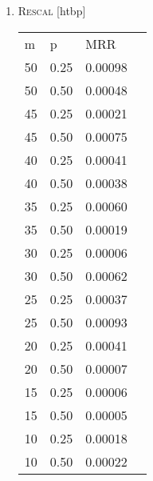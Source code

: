 \documentclass{tufte-handout}
\makeatletter
\renewenvironment{table}[1][htbp]{%
\@tufte@orig@float{table}[#1]}{%
\@tufte@orig@endfloat}%
\makeatother
\begin{document}
\begin{enumerate}
Another discouraging fact is the histogram of shortest paths between employees
and their organizations after removal of the direct edge between them:
\begin{verbatim}
{2: 187, 3: 2654, 4: 292, 5: 575, 6: 5, 7: 11, 8: 3, 9: 1, inf: 607}
\end{verbatim}
\item \textsc{Rescal}
  \begin{table}[htbp]
    \centering
    \begin{tabular}{l l l l}
  m  &   p  & MRR \\
  50 & 0.25 & 0.00098\\
  50 & 0.50 & 0.00048\\
  45 & 0.25 & 0.00021\\
  45 & 0.50 & 0.00075\\
  40 & 0.25 & 0.00041\\
  40 & 0.50 & 0.00038\\
  35 & 0.25 & 0.00060\\
  35 & 0.50 & 0.00019\\
  30 & 0.25 & 0.00006\\
  30 & 0.50 & 0.00062\\
  25 & 0.25 & 0.00037\\
  25 & 0.50 & 0.00093\\
  20 & 0.25 & 0.00041\\
  20 & 0.50 & 0.00007\\
  15 & 0.25 & 0.00006\\
  15 & 0.50 & 0.00005\\
  10 & 0.25 & 0.00018\\
  10 & 0.50 & 0.00022\\
    \end{tabular}
    \caption{Configurations vs MRR}
  \end{table}


\end{enumerate}
\end{document}
